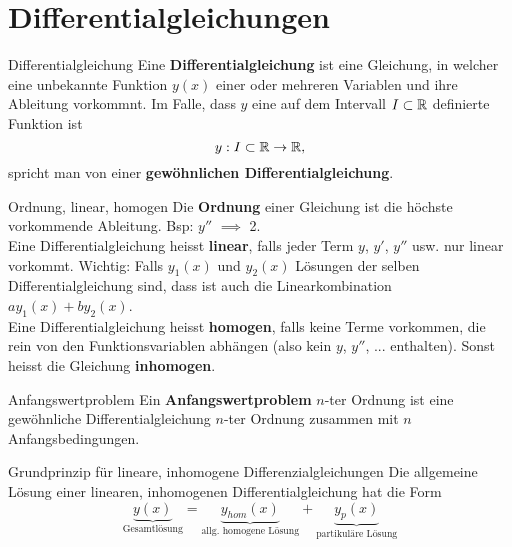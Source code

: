 \section{Differentialgleichungen}

\begin{Definition}{Differentialgleichung}{}
    Eine \textbf{Differentialgleichung} ist eine Gleichung, in welcher eine unbekannte Funktion $y(x)$ einer oder mehreren Variablen und ihre Ableitung vorkommnt. Im Falle, dass $y$ eine auf dem Intervall $I \subset \mathbb{R}$ definierte Funktion ist \[y: I \subset \mathbb{R} \to \mathbb{R},\] spricht man von einer \textbf{gewöhnlichen Differentialgleichung}.
\end{Definition}

\begin{Definition}{Ordnung, linear, homogen}{}
    Die \textbf{Ordnung} einer Gleichung ist die höchste vorkommende Ableitung. Bsp: $y''$ $\implies$ 2.\\
    
    Eine Differentialgleichung heisst \textbf{linear}, falls jeder Term $y$, $y'$, $y''$ usw. nur linear vorkommt. Wichtig: Falls $y_1(x)$ und $y_2(x)$ Lösungen der selben Differentialgleichung sind, dass ist auch die Linearkombination $ay_1(x) + by_2(x)$.\\
    
    Eine Differentialgleichung heisst \textbf{homogen}, falls keine Terme vorkommen, die rein von den Funktionsvariablen abhängen (also kein $y$, $y''$, ... enthalten). Sonst heisst die Gleichung \textbf{inhomogen}.
\end{Definition}

\begin{Definition}{Anfangswertproblem}{}
    Ein \textbf{Anfangswertproblem} $n$-ter Ordnung ist eine gewöhnliche Differentialgleichung $n$-ter Ordnung zusammen mit $n$ Anfangsbedingungen.
\end{Definition}

\begin{Satz}{Grundprinzip für lineare, inhomogene Differenzialgleichungen}{}
    Die allgemeine Lösung einer linearen, inhomogenen Differentialgleichung hat die Form
    \[
        \underbrace{y(x)}_{\text{Gesamtlösung}}
        = \underbrace{y_{hom}(x)}_{\text{allg. homogene Lösung}}
        + \underbrace{y_p(x)}_{\text{partikuläre Lösung}}
    \]
    
\end{Satz}

